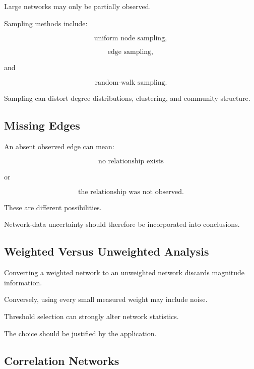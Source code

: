 Large networks may only be partially observed.

Sampling methods include:

\[
\boxed{
\text{uniform node sampling},
}
\]

\[
\boxed{
\text{edge sampling},
}
\]

and

\[
\boxed{
\text{random-walk sampling}.
}
\]

Sampling can distort degree distributions, clustering, and community
structure.

\subsection{Missing Edges}
\label{subsec:network-missing-edges}

An absent observed edge can mean:

\[
\boxed{
\text{no relationship exists}
}
\]

or

\[
\boxed{
\text{the relationship was not observed}.
}
\]

These are different possibilities.

Network-data uncertainty should therefore be incorporated into conclusions.

\subsection{Weighted Versus Unweighted Analysis}
\label{subsec:weighted-unweighted-analysis}

Converting a weighted network to an unweighted network discards magnitude
information.

Conversely, using every small measured weight may include noise.

Threshold selection can strongly alter network statistics.

The choice should be justified by the application.

\subsection{Correlation Networks}
\label{subsec:correlation-networks}

